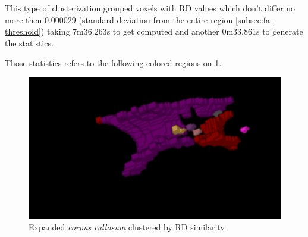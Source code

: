\documentclass[a4paper,11pt]{report}
\begin{document}
    This type of clusterization grouped voxels with RD values which don't differ no more then 0.000029 (standard deviation from the entire region \ref{subsec:fa-threshold}) taking 7m36.263s to get computed and another 0m33.861s to generate the statistics.

    Those statistics refers to the following colored regions on \ref{fig:rd-regions}.

    \begin{figure}[!ht]
      \includegraphics[width=1\linewidth]{img/regions/rd_regions.png}
      \caption{Expanded \textit{corpus callosum} clustered by RD similarity.}
      \label{fig:rd-regions}
    \end{figure}

    \newpage
\end{document}
